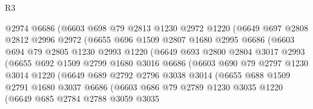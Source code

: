 \begin{lexlean}{R3}
\begin{coremodule}
                  @2974
                  @6686
                  (@6603
                    @698
                    @79
                    @2813
                    @1230
                    @2972
                    @1220
                    (@6649
                      @697
                      @2808
                      @2812
                      @2996
                      @2972
                      (@6655
                        @696
                        @1509
                        @2807
                        @1680
                        @2995
                        @6686
                        (@6603
                          @694
                          @79
                          @2805
                          @1230
                          @2993
                          @1220
                          (@6649
                            @693
                            @2800
                            @2804
                            @3017
                            @2993
                            (@6655
                              @692
                              @1509
                              @2799
                              @1680
                              @3016
                              @6686
                              (@6603
                                @690
                                @79
                                @2797
                                @1230
                                @3014
                                @1220
                                (@6649
                                  @689
                                  @2792
                                  @2796
                                  @3038
                                  @3014
                                  (@6655
                                    @688
                                    @1509
                                    @2791
                                    @1680
                                    @3037
                                    @6686
                                    (@6603
                                      @686
                                      @79
                                      @2789
                                      @1230
                                      @3035
                                      @1220
                                      (@6649
                                        @685
                                        @2784
                                        @2788
                                        @3059
                                        @3035

\end{coremodule}
\end{lexlean}
